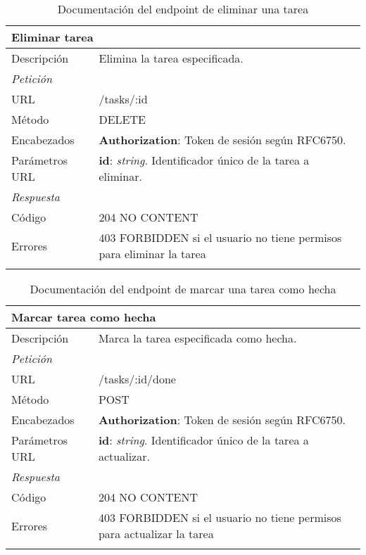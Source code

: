 \begin{longtable}{|p{} p{}|}
    \hline
    \multicolumn{2}{|l|}{\textbf{Eliminar tarea}} \\ \hline 
    Descripción         & Elimina la tarea especificada. \\ \hline \hline
    \multicolumn{2}{|l|}{\emph{Petición}}  \\ \hline 
    URL      & /tasks/:id \\ \hline
    Método   & DELETE                  \\ \hline
    Encabezados  & 
    \textbf{Authorization}: Token de sesión según RFC6750. \\ \hline
    Parámetros URL  & 
    \textbf{id}: \emph{string}. Identificador único de la tarea a eliminar. \\ \hline \hline
    \multicolumn{2}{|l|}{\emph{Respuesta}} \\ \hline 
    Código          & 204 NO CONTENT          \\ \hline \hline
    Errores & 403 FORBIDDEN si el usuario no tiene permisos para eliminar la tarea
    \\ \hline
    \caption{Documentación del endpoint de eliminar una tarea}
    \label{api:eliminar_tarea}
\end{longtable}

\begin{table}[H]
\begin{longtable}{|p{} p{}|}
    \hline
    \multicolumn{2}{|l|}{\textbf{Marcar tarea como hecha}} \\ \hline 
    Descripción         & Marca la tarea especificada como hecha. \\ \hline \hline
    \multicolumn{2}{|l|}{\emph{Petición}}  \\ \hline 
    URL      & /tasks/:id/done \\ \hline
    Método   & POST                  \\ \hline
    Encabezados  & 
    \textbf{Authorization}: Token de sesión según RFC6750. \\ \hline
    Parámetros URL  & 
    \textbf{id}: \emph{string}. Identificador único de la tarea a actualizar. \\ \hline \hline
    \multicolumn{2}{|l|}{\emph{Respuesta}} \\ \hline 
    Código          & 204 NO CONTENT          \\ \hline  \hline
    Errores & 403 FORBIDDEN si el usuario no tiene permisos para actualizar la tarea
    \\ \hline
    \caption{Documentación del endpoint de marcar una tarea como hecha}
    \label{api:marcar_tarea_hecha}
\end{longtable}
\end{table}

